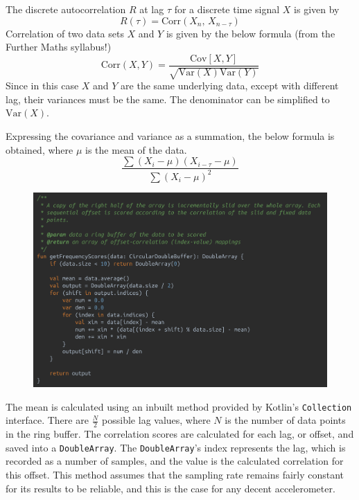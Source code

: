 \documentclass[11pt,twoside,a4paper]{report}
\begin{document}
The discrete autocorrelation $R$ at lag $\tau$ for a discrete time signal $X$ is given by
\begin{equation*}
  R(\tau) = \text{Corr}\left(X_n,\,X_{n-\tau}\right)
\end{equation*}
Correlation of two data sets $X$ and $Y$ is given by the below formula (from the Further Maths syllabus!)
\begin{equation*}
  \text{Corr}\left(X, Y\right) = \frac{\text{Cov}\left[X, Y\right]}{\sqrt{\text{Var}\left(X\right)\text{Var}\left(Y\right)}}
\end{equation*}
Since in this case $X$ and $Y$ are the same underlying data, except with different lag, their variances must be the same. The denominator can be simplified to $\text{Var}\left(X\right)$.

Expressing the covariance and variance as a summation, the below formula is obtained, where $\mu$ is the mean of the data.
\begin{equation}
  \frac{\sum \left(X_i - \mu\right)\left(X_{i-\tau} - \mu\right)}{\sum \left(X_i - \mu\right)^2}
\end{equation}

\begin{figure}[h!]
  \centering
  \includegraphics[width=1.0\textwidth]{code-autocorrelator-getFrequencyScores.png}
  \caption{}
  \label{fig:getFrequencyScores}
\end{figure}

The mean is calculated using an inbuilt method provided by Kotlin's \texttt{Collection} interface.
There are $\frac{N}{2}$ possible lag values, where $N$ is the number of data points in the ring buffer.
The correlation scores are calculated for each lag, or offset, and saved into a \texttt{DoubleArray}. The \texttt{DoubleArray}'s index represents the lag, which is recorded as a number of samples, and the value is the calculated correlation for this offset. This method assumes that the sampling rate remains fairly constant for its results to be reliable, and this is the case for any decent accelerometer.
\end{document}
